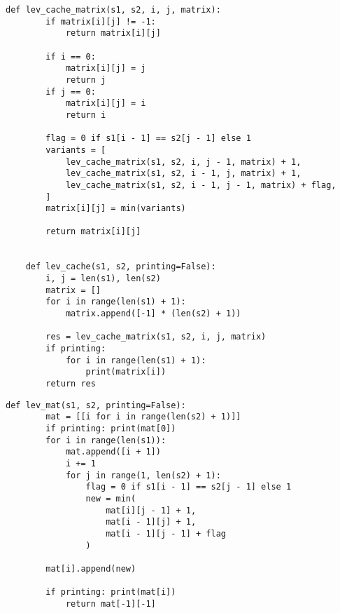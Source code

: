 \begin{center}
	\captionsetup{justification=raggedright,singlelinecheck=off}
	\renewcommand{\lstlistingname}{Листинг}
	\begin{lstlisting}[label=lst:lev_cache, caption=Рекурсивный алгоритм нахождения расстояния Левенштейна с использованием кеша]
	def lev_cache_matrix(s1, s2, i, j, matrix):
		if matrix[i][j] != -1:
			return matrix[i][j]
		
		if i == 0:
			matrix[i][j] = j
			return j
		if j == 0:
			matrix[i][j] = i
			return i
		
		flag = 0 if s1[i - 1] == s2[j - 1] else 1
		variants = [
			lev_cache_matrix(s1, s2, i, j - 1, matrix) + 1,
			lev_cache_matrix(s1, s2, i - 1, j, matrix) + 1,
			lev_cache_matrix(s1, s2, i - 1, j - 1, matrix) + flag,
		]
		matrix[i][j] = min(variants)
		
		return matrix[i][j]
	
	
	def lev_cache(s1, s2, printing=False):
		i, j = len(s1), len(s2)
		matrix = []
		for i in range(len(s1) + 1):
			matrix.append([-1] * (len(s2) + 1))
		
		res = lev_cache_matrix(s1, s2, i, j, matrix)
		if printing:
			for i in range(len(s1) + 1):
				print(matrix[i])
		return res
	\end{lstlisting}
\end{center}

\begin{center}
	\captionsetup{justification=raggedright,singlelinecheck=off}
	\renewcommand{\lstlistingname}{Листинг}
	\begin{lstlisting}[label=lst:lev_mat, caption=Матричный алгоритм нахождения расстояния Левенштейна]
	def lev_mat(s1, s2, printing=False):
		mat = [[i for i in range(len(s2) + 1)]]
		if printing: print(mat[0])
		for i in range(len(s1)):
			mat.append([i + 1])
			i += 1
			for j in range(1, len(s2) + 1):
				flag = 0 if s1[i - 1] == s2[j - 1] else 1
				new = min(
					mat[i][j - 1] + 1,
					mat[i - 1][j] + 1,
					mat[i - 1][j - 1] + flag
				)
		
		mat[i].append(new)
		
		if printing: print(mat[i])
			return mat[-1][-1]
	\end{lstlisting}
\end{center}

